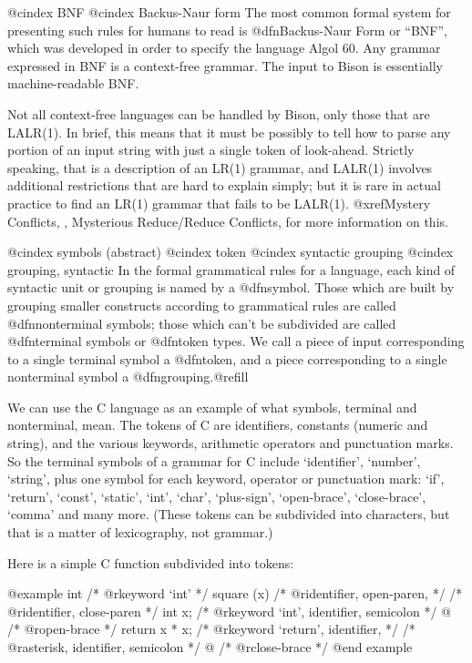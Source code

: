 @cindex BNF
@cindex Backus-Naur form
The most common formal system for presenting such rules for humans to read
is @dfn{Backus-Naur Form} or ``BNF'', which was developed in order to
specify the language Algol 60.  Any grammar expressed in BNF is a
context-free grammar.  The input to Bison is essentially machine-readable
BNF.

Not all context-free languages can be handled by Bison, only those
that are LALR(1).  In brief, this means that it must be possibly to
tell how to parse any portion of an input string with just a single
token of look-ahead.  Strictly speaking, that is a description of an
LR(1) grammar, and LALR(1) involves additional restrictions that are
hard to explain simply; but it is rare in actual practice to find an
LR(1) grammar that fails to be LALR(1).  @xref{Mystery Conflicts, ,
Mysterious Reduce/Reduce Conflicts}, for more information on this.

@cindex symbols (abstract)
@cindex token
@cindex syntactic grouping
@cindex grouping, syntactic
In the formal grammatical rules for a language, each kind of syntactic unit
or grouping is named by a @dfn{symbol}.  Those which are built by grouping
smaller constructs according to grammatical rules are called
@dfn{nonterminal symbols}; those which can't be subdivided are called
@dfn{terminal symbols} or @dfn{token types}.  We call a piece of input
corresponding to a single terminal symbol a @dfn{token}, and a piece
corresponding to a single nonterminal symbol a @dfn{grouping}.@refill

We can use the C language as an example of what symbols, terminal and
nonterminal, mean.  The tokens of C are identifiers, constants (numeric and
string), and the various keywords, arithmetic operators and punctuation
marks.  So the terminal symbols of a grammar for C include `identifier',
`number', `string', plus one symbol for each keyword, operator or
punctuation mark: `if', `return', `const', `static', `int', `char',
`plus-sign', `open-brace', `close-brace', `comma' and many more.  (These
tokens can be subdivided into characters, but that is a matter of
lexicography, not grammar.)

Here is a simple C function subdivided into tokens:

@example
int             /* @r{keyword `int'} */
square (x)      /* @r{identifier, open-paren,} */
                /* @r{identifier, close-paren} */
     int x;     /* @r{keyword `int', identifier, semicolon} */
@{               /* @r{open-brace} */
  return x * x; /* @r{keyword `return', identifier,} */
                /* @r{asterisk, identifier, semicolon} */
@}               /* @r{close-brace} */
@end example

